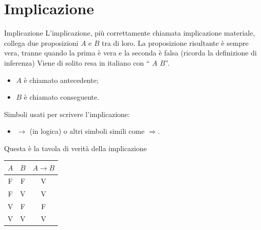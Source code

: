 \documentclass[10pt,dvipsnames]{beamer}
\begin{document}



\section{Implicazione}

\begin{frame}{Implicazione}
    L'\alert{implicazione}, più correttamente chiamata \alert{implicazione materiale}, collega due proposizioni $A$ e $B$ tra di loro. La proposizione risultante è sempre vera, tranne quando la prima è vera e la seconda è falsa (ricorda la definizione di inferenza)
    \medskip
    Viene di solito resa in italiano con `` $A$  $B$''.
    \begin{itemize}
        \item $A$ è chiamato \alert{antecedente};
        \item $B$ è chiamato \alert{conseguente}.
    \end{itemize}

    \medskip
    Simboli usati per scrivere l'implicazione:
    \begin{itemize}
        \item \alert{$\to$ (in logica)} o altri simboli simili come $\Rightarrow$.
    \end{itemize}

    \pause
    \medskip
    Questa è la tavola di verità della implicazione

    \medskip
    \begin{center}
        \begin{tabular}{c|c||c}
            $A$ & $B$ & $A \to B$ \\
            \hline
            F   & F   & V         \\
            F   & V   & V         \\
            V   & F   & F         \\
            V   & V   & V
        \end{tabular}
    \end{center}
\end{frame}
\end{document}
